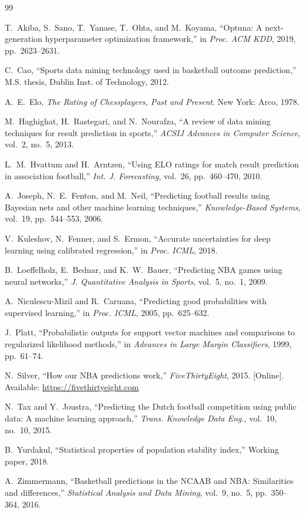 \documentclass[conference]{IEEEtran}
\begin{document}

\begin{thebibliography}{99}

T.~Akiba, S.~Sano, T.~Yanase, T.~Ohta, and M.~Koyama,
``Optuna: A next-generation hyperparameter optimization framework,''
in \emph{Proc. ACM KDD}, 2019, pp.~2623--2631.

C.~Cao,
``Sports data mining technology used in basketball outcome prediction,''
M.S. thesis, Dublin Inst. of Technology, 2012.

A.~E.~Elo,
\emph{The Rating of Chessplayers, Past and Present}.
New York: Arco, 1978.

M.~Haghighat, H.~Rastegari, and N.~Nourafza,
``A review of data mining techniques for result prediction in sports,''
\emph{ACSIJ Advances in Computer Science}, vol.~2, no.~5, 2013.

L.~M.~Hvattum and H.~Arntzen,
``Using ELO ratings for match result prediction in association football,''
\emph{Int. J. Forecasting}, vol.~26, pp.~460--470, 2010.

A.~Joseph, N.~E.~Fenton, and M.~Neil,
``Predicting football results using Bayesian nets and other machine
learning techniques,''
\emph{Knowledge-Based Systems}, vol.~19, pp.~544--553, 2006.

V.~Kuleshov, N.~Fenner, and S.~Ermon,
``Accurate uncertainties for deep learning using calibrated regression,''
in \emph{Proc. ICML}, 2018.

B.~Loeffelholz, E.~Bednar, and K.~W.~Bauer,
``Predicting NBA games using neural networks,''
\emph{J. Quantitative Analysis in Sports}, vol.~5, no.~1, 2009.

A.~Niculescu-Mizil and R.~Caruana,
``Predicting good probabilities with supervised learning,''
in \emph{Proc. ICML}, 2005, pp.~625--632.

J.~Platt,
``Probabilistic outputs for support vector machines and comparisons
to regularized likelihood methods,''
in \emph{Advances in Large Margin Classifiers}, 1999, pp.~61--74.

N.~Silver,
``How our NBA predictions work,''
\emph{FiveThirtyEight}, 2015. [Online].
Available: \url{https://fivethirtyeight.com}

N.~Tax and Y.~Joustra,
``Predicting the Dutch football competition using public data:
A machine learning approach,''
\emph{Trans. Knowledge Data Eng.}, vol.~10, no.~10, 2015.

B.~Yurdakul,
``Statistical properties of population stability index,''
Working paper, 2018.

A.~Zimmermann,
``Basketball predictions in the NCAAB and NBA: Similarities and
differences,''
\emph{Statistical Analysis and Data Mining}, vol.~9, no.~5,
pp.~350--364, 2016.

\end{thebibliography}
\end{document}
